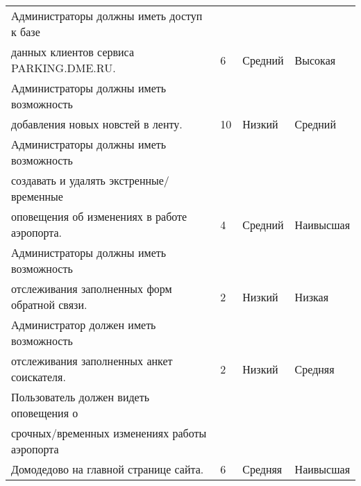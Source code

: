 \begin{table}[h!]
\begin{tabular}{|l|l|l|l|}
    Администраторы должны иметь доступ к базе\\                  данных клиентов сервиса PARKING.DME.RU.                                                                                                                                                                                                                                              & 6            & Средний & Высокая        \\ \hline
    Администраторы должны иметь возможность\\                  добавления новых новстей в ленту.                                                                                                                                                                                                                                                      & 10           & Низкий  & Средний        \\ \hline
    Администраторы должны иметь возможность\\                  создавать и удалять экстренные/временные\\                  оповещения об изменениях в работе аэропорта.                                                                                                                                                                               & 4            & Средний & Наивысшая      \\ \hline
    Администраторы должны иметь возможность\\                  отслеживания заполненных форм обратной связи.                                                                                                                                                                                                                                          & 2            & Низкий  & Низкая         \\ \hline
    Администратор должен иметь возможность\\                  отслеживания заполненных анкет соискателя.                                                                                                                                                                                                                                              & 2            & Низкий  & Средняя        \\ \hline
    Пользователь должен видеть оповещения о\\            срочных/временных изменениях работы аэропорта\\            Домодедово на главной странице сайта.                                                                                                                                                                                             & 6            & Средняя & Наивысшая      \\ \hline

\end{tabular}
\end{table}
